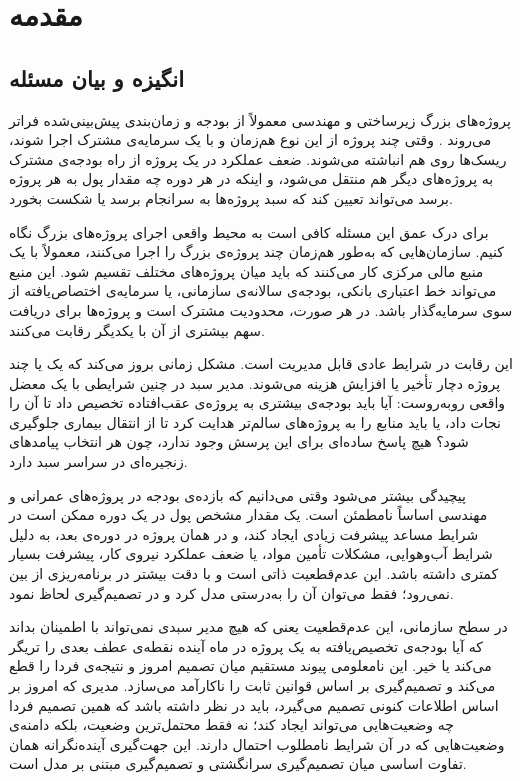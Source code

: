 
\chapter{مقدمه}
\label{chap:introduction}

\section{انگیزه و بیان مسئله}
\label{sec:motivation}

پروژه‌های بزرگ زیرساختی و مهندسی معمولاً از بودجه و زمان‌بندی
پیش‌بینی‌شده فراتر می‌روند \citep{Flyvbjerg2003, Merrow2011}.
وقتی چند پروژه از این نوع هم‌زمان و با یک سرمایه‌ی مشترک اجرا شوند،
ریسک‌ها روی هم انباشته می‌شوند. ضعف عملکرد در یک پروژه از راه
بودجه‌ی مشترک به پروژه‌های دیگر هم منتقل می‌شود، و اینکه در هر دوره
چه مقدار پول به هر پروژه برسد می‌تواند تعیین کند که سبد پروژه‌ها
به سرانجام برسد یا شکست بخورد.

برای درک عمق این مسئله کافی است به محیط واقعی اجرای پروژه‌های بزرگ
نگاه کنیم. سازمان‌هایی که به‌طور هم‌زمان چند پروژه‌ی بزرگ را اجرا
می‌کنند، معمولاً با یک منبع مالی مرکزی کار می‌کنند که باید میان
پروژه‌های مختلف تقسیم شود. این منبع می‌تواند خط اعتباری بانکی،
بودجه‌ی سالانه‌ی سازمانی، یا سرمایه‌ی اختصاص‌یافته از سوی سرمایه‌گذار
باشد. در هر صورت، محدودیت مشترک است و پروژه‌ها برای دریافت سهم
بیشتری از آن با یکدیگر رقابت می‌کنند.

این رقابت در شرایط عادی قابل مدیریت است. مشکل زمانی بروز می‌کند که
یک یا چند پروژه دچار تأخیر یا افزایش هزینه می‌شوند. مدیر سبد در
چنین شرایطی با یک معضل واقعی روبه‌روست: آیا باید بودجه‌ی بیشتری به
پروژه‌ی عقب‌افتاده تخصیص داد تا آن را نجات داد، یا باید منابع را به
پروژه‌های سالم‌تر هدایت کرد تا از انتقال بیماری جلوگیری شود؟ هیچ
پاسخ ساده‌ای برای این پرسش وجود ندارد، چون هر انتخاب پیامدهای زنجیره‌ای
در سراسر سبد دارد.

پیچیدگی بیشتر می‌شود وقتی می‌دانیم که بازده‌ی بودجه در پروژه‌های
عمرانی و مهندسی اساساً نامطمئن است. یک مقدار مشخص پول در یک دوره
ممکن است در شرایط مساعد پیشرفت زیادی ایجاد کند، و در همان پروژه در
دوره‌ی بعد، به دلیل شرایط آب‌وهوایی، مشکلات تأمین مواد، یا ضعف
عملکرد نیروی کار، پیشرفت بسیار کمتری داشته باشد. این عدم‌قطعیت
ذاتی است و با دقت بیشتر در برنامه‌ریزی از بین نمی‌رود؛ فقط می‌توان
آن را به‌درستی مدل کرد و در تصمیم‌گیری لحاظ نمود.

در سطح سازمانی، این عدم‌قطعیت یعنی که هیچ مدیر سبدی نمی‌تواند با
اطمینان بداند که آیا بودجه‌ی تخصیص‌یافته به یک پروژه در ماه آینده
نقطه‌ی عطف بعدی را تریگر می‌کند یا خیر. این نامعلومی
پیوند مستقیم میان تصمیم امروز و نتیجه‌ی فردا را قطع می‌کند و
تصمیم‌گیری بر اساس قوانین ثابت را ناکارآمد می‌سازد. مدیری که
امروز بر اساس اطلاعات کنونی تصمیم می‌گیرد، باید در نظر داشته
باشد که همین تصمیم فردا چه وضعیت‌هایی می‌تواند ایجاد کند؛ نه فقط
محتمل‌ترین وضعیت، بلکه دامنه‌ی وضعیت‌هایی که در آن شرایط نامطلوب
احتمال دارند. این جهت‌گیری آینده‌نگرانه همان تفاوت اساسی
میان تصمیم‌گیری سرانگشتی و تصمیم‌گیری مبتنی بر مدل است.

